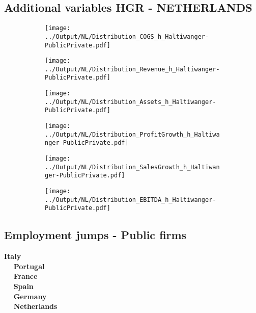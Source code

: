 \documentclass[12pt,notitlepage]{article}
\begin{document}
\subsection*{Additional variables HGR - NETHERLANDS}
\begin{figure}[!htpb]
\centering
\begin{subfigure}{.49\textwidth}
    \centering
 \texttt{[image: ../Output/NL/Distribution\_COGS\_h\_Haltiwanger-PublicPrivate.pdf]}
\end{subfigure}%
\begin{subfigure}{.49\textwidth}
    \centering
 \texttt{[image: ../Output/NL/Distribution\_Revenue\_h\_Haltiwanger-PublicPrivate.pdf]}
\end{subfigure}
\begin{subfigure}{.49\textwidth}
    \centering
 \texttt{[image: ../Output/NL/Distribution\_Assets\_h\_Haltiwanger-PublicPrivate.pdf]}
\end{subfigure}%
\begin{subfigure}{.49\textwidth}
    \centering
 \texttt{[image: ../Output/NL/Distribution\_ProfitGrowth\_h\_Haltiwanger-PublicPrivate.pdf]}
\end{subfigure}
\begin{subfigure}{.49\textwidth}
    \centering
 \texttt{[image: ../Output/NL/Distribution\_SalesGrowth\_h\_Haltiwanger-PublicPrivate.pdf]}
\end{subfigure}
\begin{subfigure}{.49\textwidth}
    \centering
 \texttt{[image: ../Output/NL/Distribution\_EBITDA\_h\_Haltiwanger-PublicPrivate.pdf]}
\end{subfigure}
\end{figure}
\clearpage



\subsection{Employment jumps - Public firms}
\begin{center}
\textbf{Italy}\\~\
\resizebox{.45\linewidth}{!}{}
\clearpage
\textbf{Portugal}\\~\
\resizebox{.45\linewidth}{!}{}
\clearpage
\textbf{France}\\~\
\resizebox{.45\linewidth}{!}{}
\clearpage
\textbf{Spain}\\~\
\resizebox{.45\linewidth}{!}{}
\clearpage
\textbf{Germany}\\~\
\resizebox{.45\linewidth}{!}{}
\clearpage
\textbf{Netherlands}\\~\
\resizebox{.45\linewidth}{!}{}
\clearpage
\end{center}
\end{document}
